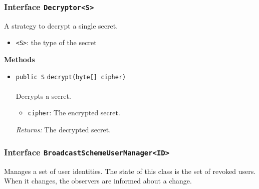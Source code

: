 \subsubsection{Interface \lstinline|Decryptor<S>|}
A strategy to decrypt a single secret. \\
\noindent\begin{minipage}[t]{5cm}
\vspace{0.3em}
\hspace*{2em}
\vspace{0.3em}
\end{minipage}

\begin{itemize}
\item \lstinline|<S>|: the type of the secret
\end{itemize}




\textbf{\sffamily Methods}
\begin{itemize}
\item \lstinline|public S| \lstinline|decrypt|\lstinline|(byte[] cipher)|\\ \\[-0.6em]
Decrypts a secret.
\begin{itemize}
\item \lstinline|cipher|: The encrypted secret.
\end{itemize}

\emph{Returns:} The decrypted secret.

\end{itemize}

\subsubsection{Interface \lstinline|BroadcastSchemeUserManager<ID>|}
Manages a set of user identities.
 The state of this class is the set of revoked users.
 When it changes, the observers are informed about a change. \\
\noindent\begin{minipage}[t]{5cm}
\vspace{0.3em}
\hspace*{2em}
\vspace{0.3em}
\end{minipage}

